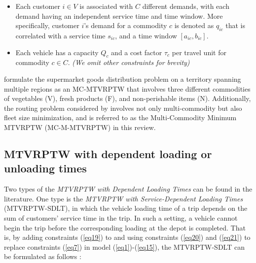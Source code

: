 \documentclass[11pt]{article}
\begin{document}
\begin{itemize}
    \item Each customer $i \in V$ is associated with $C$ different demands, with each demand having an independent service time and time window.  More specifically, customer $i$'s demand for a commodity $c$ is denoted as $q_{ic}$ that is correlated with a service time $s_{ic}$, and a time window $[a_{ic},b_{ic}]$.
    \item Each vehicle has a capacity $Q_c$ and a cost factor $\tau_c$ per travel unit for commodity $c \in C$.
    \newline
    \textit{(We omit other constraints for brevity)}
\end{itemize}

\cite{battarra2009adaptive} formulate the supermarket goods distribution problem on a territory spanning multiple regions as an MC-MTVRPTW that involves three different commodities of vegetables (V), fresh products (F), and non-perishable items (N).  Additionally, the routing problem considered by \cite{battarra2009adaptive} involves not only multi-commodity but also fleet size minimization, and is referred to as the Multi-Commodity Minimum MTVRPTW (MC-M-MTVRPTW) in this review.

\subsection{MTVRPTW with dependent loading or unloading times}


Two types of the \textit{MTVRPTW with Dependent Loading Times} can be found in the literature.  One type is the \textit{MTVRPTW with Service-Dependent Loading Times} (MTVRPTW-SDLT), in which the vehicle loading time of a trip depends on the sum of customers' service time in the trip.  In such a setting, a vehicle cannot begin the trip before the corresponding loading at the depot is completed. That is, by adding constraints (\ref{eq19}) to and using constraints (\ref{eq20}) and (\ref{eq21}) to replace constraints (\ref{eq7}) in model (\ref{eq1})-(\ref{eq15}), the MTVRPTW-SDLT can be formulated as follows \citep{azi2010exact}:
\end{document}
